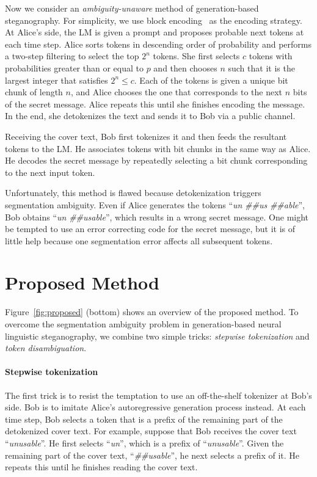 \documentclass[11pt]{article}
\begin{document}
Now we consider an \textit{ambiguity-unaware} method of generation-based steganography.
For simplicity, we use block encoding~\citep{fang-etal-2017-generating} as the encoding strategy.
At Alice's side, the LM is given a prompt and proposes probable next tokens at each time step.
Alice sorts tokens in descending order of probability and performs a two-step filtering to select the top $2^n$ tokens.
She first selects $c$ tokens with probabilities greater than or equal to $p$ and then chooses $n$ such that it is the largest integer that satisfies $2^n \leq c$.
Each of the tokens is given a unique bit chunk of length $n$, and Alice chooses the one that corresponds to the next $n$ bits of the secret message.
Alice repeats this until she finishes encoding the message.
In the end, she detokenizes the text and sends it to Bob via a public channel.

Receiving the cover text, Bob first tokenizes it and then feeds the resultant tokens to the LM.
He associates tokens with bit chunks in the same way as Alice.
He decodes the secret message by repeatedly selecting a bit chunk corresponding to the next input token.

Unfortunately, this method is flawed because detokenization triggers segmentation ambiguity.
Even if Alice generates the tokens ``\textit{un} \textit{\#\#us} \textit{\#\#able}'', Bob obtains ``\textit{un} \textit{\#\#usable}'', which results in a wrong secret message.
One might be tempted to use an error correcting code for the secret message, but it is of little help because one segmentation error affects all subsequent tokens.


\section{Proposed Method} \label{sec:proposed}
Figure~\ref{fig:proposed} (bottom) shows an overview of the proposed method.
To overcome the segmentation ambiguity problem in generation-based neural linguistic steganography, we combine two simple tricks: \textit{stepwise tokenization} and \textit{token disambiguation}.


\paragraph{Stepwise tokenization}
The first trick is to resist the temptation to use an off-the-shelf tokenizer at Bob's side.
Bob is to imitate Alice's autoregressive generation process instead.
At each time step, Bob selects a token that is a prefix of the remaining part of the detokenized cover text.
For example, suppose that Bob receives the cover text ``\textit{unusable}''.
He first selects ``\textit{un}'', which is a prefix of ``\textit{unusable}''.
Given the remaining part of the cover text, ``\textit{\#\#usable}'', he next selects a prefix of it. 
He repeats this until he finishes reading the cover text.
\end{document}
